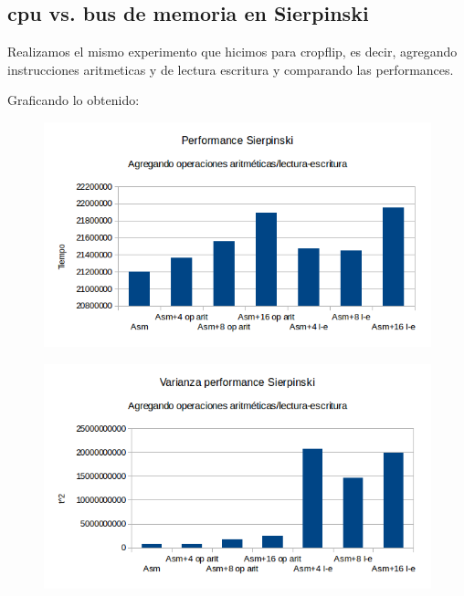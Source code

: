 \documentclass[a4paper]{article}
\begin{document}
\newpage
\subsection{cpu vs. bus de memoria en Sierpinski}

Realizamos el mismo experimento que hicimos para cropflip, es decir, agregando instrucciones aritmeticas y de lectura escritura y comparando las performances.

Graficando lo obtenido:

\begin{figure}[h!]
  \begin{center}
  \includegraphics[scale=0.66]{Graficos1.5/sie/per.png}
  \label{nombreparareferenciar1}
  \end{center}
\end{figure}

\begin{figure}[h!]
  \begin{center}
  \includegraphics[scale=0.66]{Graficos1.5/sie/var.png}
  \label{nombreparareferenciar1}
  \end{center}
\end{figure}
\end{document}

